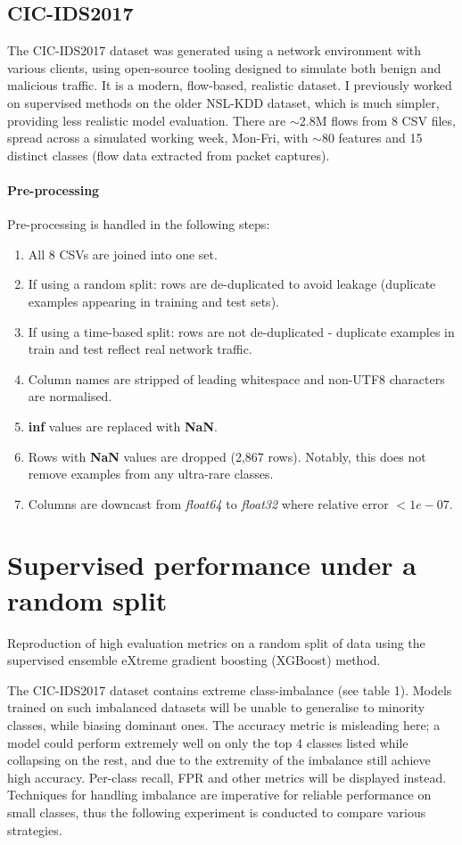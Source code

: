 \documentclass{article}
\begin{document}
\subsection{CIC-IDS2017}
The CIC-IDS2017 dataset was generated using a network environment with various clients, using open-source tooling designed to simulate both benign and malicious traffic\parencite{sharafaldin2018}. It is a modern, flow-based, realistic dataset. I previously worked on supervised methods on the older NSL-KDD dataset, which is much simpler, providing less realistic model evaluation. There are $\sim$2.8M flows from 8 CSV files, spread across a simulated working week, Mon-Fri, with $\sim$80 features and 15 distinct classes (flow data extracted from packet captures). 
\paragraph{Pre-processing}
\par Pre-processing is handled in the following steps:
\begin{enumerate}
  \item All 8 CSVs are joined into one set.
  \item If using a random split: rows are de-duplicated to avoid leakage (duplicate examples appearing in training and test sets).
  \item If using a time-based split: rows are not de-duplicated - duplicate examples in train and test reflect real network traffic.
  \item Column names are stripped of leading whitespace and non-UTF8 characters are normalised.
  \item \textbf{inf} values are replaced with \textbf{NaN}.
  \item Rows with \textbf{NaN} values are dropped (2,867 rows). Notably, this does not remove examples from any ultra-rare classes.
  \item Columns are downcast from \textit{float64} to \textit{float32} where relative error $< 1e-07$.
\end{enumerate}


\section{Supervised performance under a random split}
Reproduction of high evaluation metrics on a random split of data using the supervised ensemble eXtreme gradient boosting (XGBoost) method.

The CIC-IDS2017 dataset contains extreme class-imbalance (see table 1). Models trained on such imbalanced datasets will be unable to generalise to minority classes, while biasing dominant ones. The accuracy metric is misleading here; a model could perform extremely well on only the top 4 classes listed while collapsing on the rest, and due to the extremity of the imbalance still achieve high accuracy. Per-class recall, FPR and other metrics will be displayed instead. Techniques for handling imbalance are imperative for reliable performance on small classes, thus the following experiment is conducted to compare various strategies.
\end{document}
